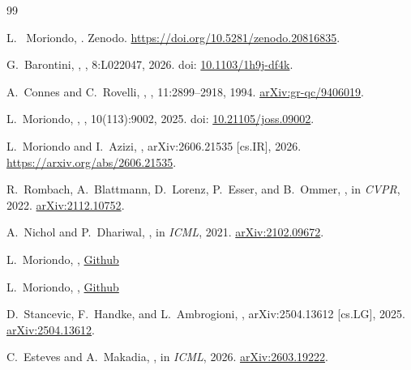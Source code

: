 \documentclass[11pt]{article}
\begin{document}
\newpage
\begin{thebibliography}{99}

L.~ Moriondo,
.
\newblock Zenodo.
\newblock \url{https://doi.org/10.5281/zenodo.20816835}.


G.~Barontini,
,
, 8:L022047, 2026.
\newblock doi: \href{https://doi.org/10.1103/1h9j-df4k}{10.1103/1h9j-df4k}.

A.~Connes and C.~Rovelli,
,
, 11:2899--2918, 1994.
\newblock \href{https://arxiv.org/abs/gr-qc/9406019}{arXiv:gr-qc/9406019}.

L.~Moriondo,
,
, 10(113):9002, 2025.
\newblock doi: \href{https://doi.org/10.21105/joss.09002}{10.21105/joss.09002}.

L.~Moriondo and I.~Azizi,
,
\newblock arXiv:2606.21535 [cs.IR], 2026.
\newblock \href{https://arxiv.org/abs/2606.21535}{https://arxiv.org/abs/2606.21535}.

R.~Rombach, A.~Blattmann, D.~Lorenz, P.~Esser, and B.~Ommer,
,
\newblock in {\em CVPR}, 2022.
\newblock \href{https://arxiv.org/abs/2112.10752}{arXiv:2112.10752}.

A.~Nichol and P.~Dhariwal,
,
\newblock in {\em ICML}, 2021.
\newblock \href{https://arxiv.org/abs/2102.09672}{arXiv:2102.09672}.

L.~Moriondo,
,
\newblock \href{https://github.com/tuned-org-uk/entropic-semantic-diffusion}{Github}

L.~Moriondo,
,
\newblock \href{https://github.com/tuned-org-uk/arrowspace-latent-diffusion}{Github}

D.~Stancevic, F.~Handke, and L.~Ambrogioni,
,
\newblock arXiv:2504.13612 [cs.LG], 2025.
\newblock \href{https://arxiv.org/abs/2504.13612}{arXiv:2504.13612}.

C.~Esteves and A.~Makadia,
,
\newblock in {\em ICML}, 2026.
\newblock \href{https://arxiv.org/abs/2603.19222}{arXiv:2603.19222}.

\end{thebibliography}
\end{document}
